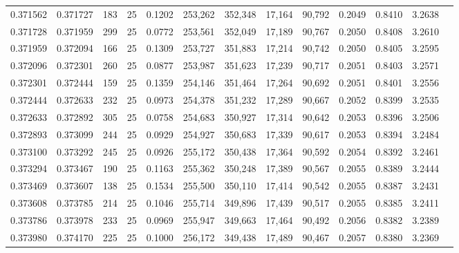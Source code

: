 \begin{tabular}{rrrrrrrrrrrrr}
0.371562 & 0.371727 &   183 &  25 &                                     0.1202 & 253,262 & 352,348 &  17,164 &  90,792 & 0.2049 & 0.8410 & 3.2638 \\
0.371728 & 0.371959 &   299 &  25 &                                     0.0772 & 253,561 & 352,049 &  17,189 &  90,767 & 0.2050 & 0.8408 & 3.2610 \\
0.371959 & 0.372094 &   166 &  25 &                                     0.1309 & 253,727 & 351,883 &  17,214 &  90,742 & 0.2050 & 0.8405 & 3.2595 \\
0.372096 & 0.372301 &   260 &  25 &                                     0.0877 & 253,987 & 351,623 &  17,239 &  90,717 & 0.2051 & 0.8403 & 3.2571 \\
0.372301 & 0.372444 &   159 &  25 &                                     0.1359 & 254,146 & 351,464 &  17,264 &  90,692 & 0.2051 & 0.8401 & 3.2556 \\
0.372444 & 0.372633 &   232 &  25 &                                     0.0973 & 254,378 & 351,232 &  17,289 &  90,667 & 0.2052 & 0.8399 & 3.2535 \\
0.372633 & 0.372892 &   305 &  25 &                                     0.0758 & 254,683 & 350,927 &  17,314 &  90,642 & 0.2053 & 0.8396 & 3.2506 \\
0.372893 & 0.373099 &   244 &  25 &                                     0.0929 & 254,927 & 350,683 &  17,339 &  90,617 & 0.2053 & 0.8394 & 3.2484 \\
0.373100 & 0.373292 &   245 &  25 &                                     0.0926 & 255,172 & 350,438 &  17,364 &  90,592 & 0.2054 & 0.8392 & 3.2461 \\
0.373294 & 0.373467 &   190 &  25 &                                     0.1163 & 255,362 & 350,248 &  17,389 &  90,567 & 0.2055 & 0.8389 & 3.2444 \\
0.373469 & 0.373607 &   138 &  25 &                                     0.1534 & 255,500 & 350,110 &  17,414 &  90,542 & 0.2055 & 0.8387 & 3.2431 \\
0.373608 & 0.373785 &   214 &  25 &                                     0.1046 & 255,714 & 349,896 &  17,439 &  90,517 & 0.2055 & 0.8385 & 3.2411 \\
0.373786 & 0.373978 &   233 &  25 &                                     0.0969 & 255,947 & 349,663 &  17,464 &  90,492 & 0.2056 & 0.8382 & 3.2389 \\
0.373980 & 0.374170 &   225 &  25 &                                     0.1000 & 256,172 & 349,438 &  17,489 &  90,467 & 0.2057 & 0.8380 & 3.2369 \\

\end{tabular}
